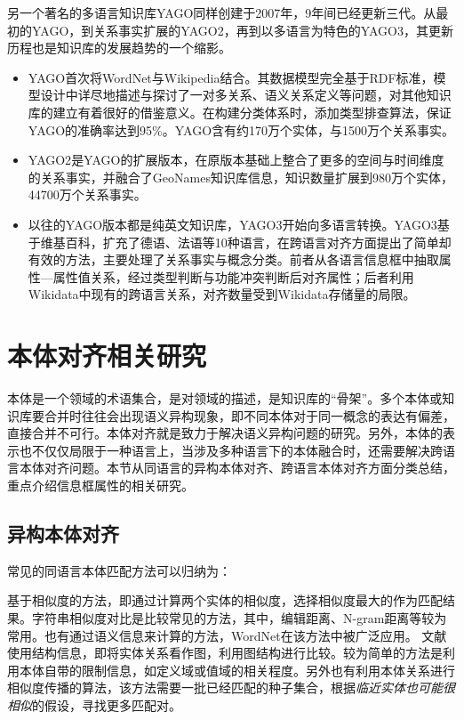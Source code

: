 另一个著名的多语言知识库YAGO同样创建于2007年，9年间已经更新三代。从最初的YAGO\cite{suchanek2007yago,suchanek2008yago}，到关系事实扩展的YAGO2\cite{hoffart2013yago2}，再到以多语言为特色的YAGO3\cite{mahdisoltani2014yago3}，其更新历程也是知识库的发展趋势的一个缩影。
\begin{itemize}
  \item {\heiti YAGO}首次将WordNet\cite{fellbaum1998wordnet}与Wikipedia结合。其数据模型完全基于RDF标准，模型设计中详尽地描述与探讨了一对多关系、语义关系定义等问题，对其他知识库的建立有着很好的借鉴意义。在构建分类体系时，添加类型排查算法，保证YAGO的准确率达到95\%。YAGO含有约170万个实体，与1500万个关系事实。
  \item {\heiti YAGO2}是YAGO的扩展版本，在原版本基础上整合了更多的空间与时间维度的关系事实，并融合了GeoNames知识库信息，知识数量扩展到980万个实体，44700万个关系事实。
  \item 以往的YAGO版本都是纯英文知识库，{\heiti YAGO3}开始向多语言转换。YAGO3基于维基百科，扩充了德语、法语等10种语言，在跨语言对齐方面提出了简单却有效的方法，主要处理了关系事实与概念分类。前者从各语言信息框中抽取属性—属性值关系，经过类型判断与功能冲突判断后对齐属性；后者利用Wikidata中现有的跨语言关系，对齐数量受到Wikidata存储量的局限。
\end{itemize}

\section{本体对齐相关研究}
\label{sec:ontology-research}

本体是一个领域的术语集合，是对领域的描述，是知识库的“骨架”。多个本体或知识库要合并时往往会出现{\heiti 语义异构}现象，即不同本体对于同一概念的表达有偏差，直接合并不可行。本体对齐就是致力于解决语义异构问题的研究。另外，本体的表示也不仅仅局限于一种语言上，当涉及多种语言下的本体融合时，还需要解决跨语言本体对齐问题。本节从同语言的异构本体对齐、跨语言本体对齐方面分类总结，重点介绍信息框属性的相关研究。

\subsection{异构本体对齐}
常见的同语言本体匹配方法可以归纳为：

{\heiti 基于相似度的方法}，即通过计算两个实体的相似度，选择相似度最大的作为匹配结果。字符串相似度对比是比较常见的方法，其中，编辑距离、N-gram距离等较为常用。也有通过语义信息来计算的方法，WordNet\cite{miller1995wordnet}在该方法中被广泛应用。 
文献\cite{hu2008matching}使用结构信息，即将实体关系看作图，利用图结构进行比较。较为简单的方法是利用本体自带的限制信息，如定义域或值域的相关程度。另外也有利用本体关系进行相似度传播的算法，该方法需要一批已经匹配的种子集合，根据\textit{临近实体也可能很相似}的假设，寻找更多匹配对。


